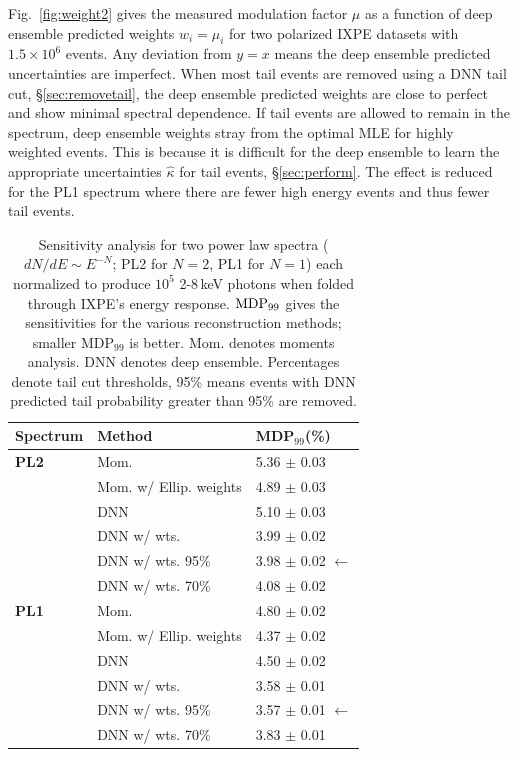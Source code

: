 Fig.~\ref{fig:weight2} gives the measured modulation factor $\mu$ as a function of deep ensemble predicted weights $w_i = \mu_i$ for two polarized IXPE datasets with $1.5 \times 10^6$ events.
Any deviation from $y=x$ means the deep ensemble predicted uncertainties are imperfect. When most tail events are removed using a DNN tail cut, \S\ref{sec:removetail}, the deep ensemble predicted weights are close to perfect and show minimal spectral dependence. If tail events are allowed to remain in the spectrum, deep ensemble weights stray from the optimal MLE for highly weighted events. This is because it is difficult for the deep ensemble to learn the appropriate uncertainties $\hat{\kappa}$ for tail events, \S\ref{sec:perform}.
The effect is reduced for the PL1 spectrum where there are fewer high energy events and thus fewer tail events.



\begin{table}[t]
\centering
\begin{tabular}{@{}l l l @{}}
\toprule
{\textbf{Spectrum}}&{\textbf{Method}}&MDP$_{99}$(\%) \\
\midrule
{\textbf{PL2}} & { Mom.} & {5.36 $\pm$ 0.03}\\ %
& { Mom. w/ Ellip. weights} & {4.89 $\pm$ 0.03}\\ %
& { DNN } &{5.10 $\pm$ 0.03 }\\
& { DNN w/ wts.} &{3.99 $\pm$ 0.02}\\
& { DNN w/ wts. 95\%} &{3.98 $\pm$ 0.02 $\leftarrow$}\\
& { DNN w/ wts. 70\%} &{4.08 $\pm$ 0.02}\\
\midrule
{\textbf{PL1}} & { Mom.} & {4.80 $\pm$ 0.02}\\ %
& { Mom. w/ Ellip. weights} & {4.37 $\pm$ 0.02}\\ %
& { DNN } &{4.50 $\pm$ 0.02}\\
& { DNN w/ wts.} & {3.58 $\pm$ 0.01}\\
& { DNN w/ wts. 95\%} &{3.57 $\pm$ 0.01 $\leftarrow$}\\
& { DNN w/ wts. 70\%} &{3.83 $\pm$ 0.01}\\
 \bottomrule
\end{tabular}
\caption{Sensitivity analysis for two power law spectra ($dN/dE \sim E^{-N}$; PL2 for $N=2$, PL1 for $N=1$) each normalized to produce $10^5$ 2-8\,keV photons when folded through IXPE's energy response. ${\rm MDP}_{99}$ gives the sensitivities for the various reconstruction methods; smaller MDP$_{99}$ is better. Mom. denotes moments analysis. DNN denotes deep ensemble. Percentages denote tail cut thresholds, 95\% means events with DNN predicted tail probability greater than 95\% are removed. } 

\label{tab:fom2}
\end{table}

